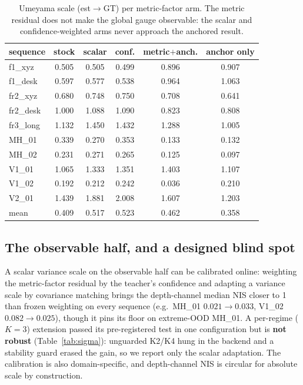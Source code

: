 \begin{table}[t]
\centering
\caption{Umeyama scale (est$\to$GT) per metric-factor arm. The metric residual
does not make the global gauge observable: the scalar and confidence-weighted
arms never approach the anchored result.}
\label{tab:arms}
\scriptsize
\setlength{\tabcolsep}{4pt}
\begin{tabular}{@{}lccccc@{}}
\toprule
sequence & stock & scalar & conf. & metric$+$anch. & anchor only \\
\midrule
f1\_xyz & 0.505 & 0.505 & 0.499 & 0.896 & 0.907 \\
f1\_desk & 0.597 & 0.577 & 0.538 & 0.964 & 1.063 \\
fr2\_xyz & 0.680 & 0.748 & 0.750 & 0.708 & 0.641 \\
fr2\_desk & 1.000 & 1.088 & 1.090 & 0.823 & 0.808 \\
fr3\_long & 1.132 & 1.450 & 1.432 & 1.288 & 1.005 \\
MH\_01 & 0.339 & 0.270 & 0.353 & 0.133 & 0.132 \\
MH\_02 & 0.231 & 0.271 & 0.265 & 0.125 & 0.097 \\
V1\_01 & 1.065 & 1.333 & 1.351 & 1.403 & 1.107 \\
V1\_02 & 0.192 & 0.212 & 0.242 & 0.036 & 0.210 \\
V2\_01 & 1.439 & 1.881 & 2.008 & 1.607 & 1.203 \\
\midrule
mean & 0.409 & 0.517 & 0.523 & 0.462 & 0.358 \\
\bottomrule
\end{tabular}
\end{table}

\subsection{The observable half, and a designed blind spot}
\label{sec:observable}

A scalar variance scale on the observable half can be calibrated online:
weighting the metric-factor residual by the teacher's confidence and adapting a
variance scale by covariance matching brings the depth-channel median NIS closer
to 1 than frozen weighting on every sequence (e.g.\ MH\_01 $0.021\to0.033$,
V1\_02 $0.082\to0.025$), though it pins its floor on extreme-OOD MH\_01. A
per-regime ($K{=}3$) extension passed its pre-registered test in one
configuration but is \textbf{not robust} (Table~\ref{tab:sigma}): unguarded K2/K4
hung in the backend and a stability guard erased the gain, so we report only the
scalar adaptation. The
calibration is also domain-specific, and depth-channel NIS is circular for
absolute scale by construction.


